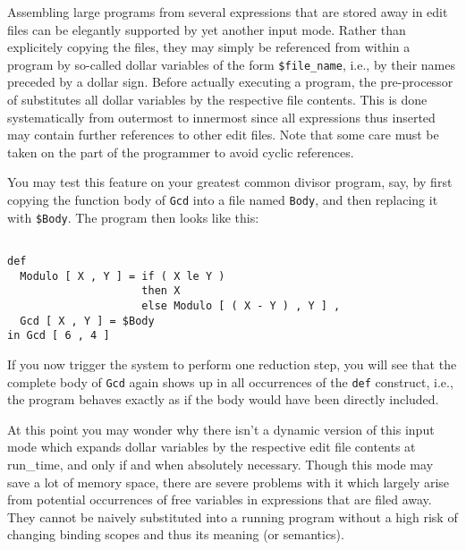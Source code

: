 Assembling  large programs from several \kir expressions that are stored away 
in edit files can be elegantly supported by yet another input mode. Rather
than explicitely copying the files, they may simply be referenced from within
a program by so-called {\mys dollar variables} of the form 
{\tt \$file\_name}, i.e., by their names preceded by a dollar sign. Before
actually executing a  program, 
the pre-processor of \pired substitutes all dollar variables
by the respective file contents. This is done systematically
from outermost to innermost since all
expressions thus inserted may contain further references to
other edit files. Note that some care must be taken on the part
 of the programmer to avoid {\mys cyclic references}.

You may test this feature on your {\mys greatest common divisor program}, say,
by first copying the function body of
{\tt Gcd} into a file named {\tt Body}, and then replacing it with 
{\tt \$Body}. The program then looks like this: 
\begin{verbatim}

def 
  Modulo [ X , Y ] = if ( X le Y )
                     then X
                     else Modulo [ ( X - Y ) , Y ] ,
  Gcd [ X , Y ] = $Body
in Gcd [ 6 , 4 ]

\end{verbatim}
If you now trigger the system to
 perform one reduction step, you will see that the complete body of
{\tt Gcd}  again shows up in  all occurrences of the {\tt def} construct,
i.e., the program behaves exactly as if the body would have been
directly included.

At this point you may wonder why there isn't a dynamic version of this input
mode which expands dollar variables by the respective edit file contents
 at run\_time, and only if and when absolutely necessary. Though this mode may
save a lot of memory space, there are severe problems with it
which largely arise from potential occurrences of free variables in expressions
that are filed away. They cannot be naively substituted into a running program
without a high risk of changing binding scopes and thus its meaning 
(or semantics). 

